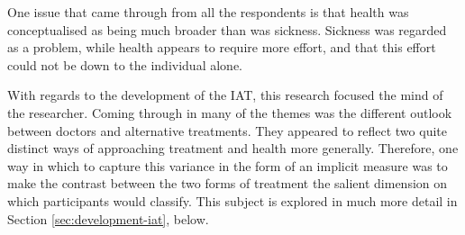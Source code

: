 One issue that came through from all the respondents is that health was conceptualised as being much broader than was sickness. Sickness was regarded as a problem, while health appears to require more effort, and that this effort could not be down to the individual alone. 

With regards to the development of the IAT, this research focused the mind of the researcher. Coming through in many of the themes was the different outlook between doctors and alternative treatments. They appeared to reflect two quite distinct ways of approaching treatment and health more generally. Therefore, one way in which to capture this variance in the form of an implicit measure was to make the contrast between the two forms of treatment the salient dimension on which participants would classify. This subject is explored in much more detail in Section \ref{sec:development-iat}, below. 

